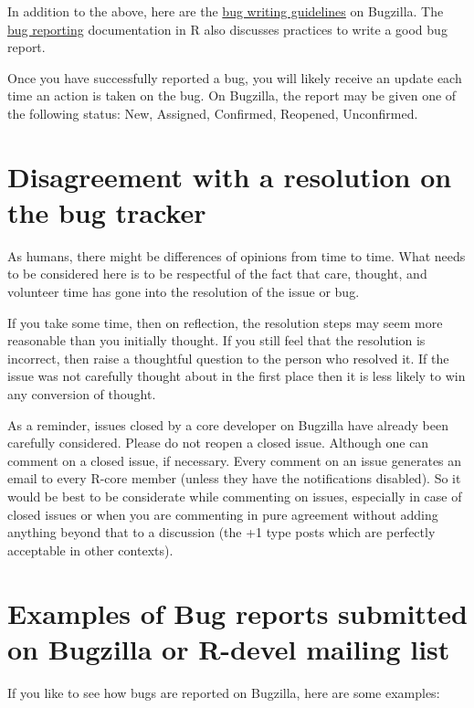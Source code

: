 \documentclass[
  letterpaper,
  DIV=11,
  numbers=noendperiod]{scrreprt}
\begin{document}
In addition to the above, here are the
\href{https://bugs.r-project.org/bugzilla/page.cgi?id=bug-writing.html}{bug
writing guidelines} on Bugzilla. The
\href{https://www.r-project.org/bugs.html\#writing-a-good-bug-report}{bug
reporting} documentation in R also discusses practices to write a good
bug report.

Once you have successfully reported a bug, you will likely receive an
update each time an action is taken on the bug. On Bugzilla, the report
may be given one of the following status: New, Assigned, Confirmed,
Reopened, Unconfirmed.

\section{Disagreement with a resolution on the bug
tracker}\label{disagreement-with-a-resolution-on-the-bug-tracker}

As humans, there might be differences of opinions from time to time.
What needs to be considered here is to be respectful of the fact that
care, thought, and volunteer time has gone into the resolution of the
issue or bug.

If you take some time, then on reflection, the resolution steps may seem
more reasonable than you initially thought. If you still feel that the
resolution is incorrect, then raise a thoughtful question to the person
who resolved it. If the issue was not carefully thought about in the
first place then it is less likely to win any conversion of thought.

As a reminder, issues closed by a core developer on Bugzilla have
already been carefully considered. Please do not reopen a closed issue.
Although one can comment on a closed issue, if necessary. Every comment
on an issue generates an email to every R-core member (unless they have
the notifications disabled). So it would be best to be considerate while
commenting on issues, especially in case of closed issues or when you
are commenting in pure agreement without adding anything beyond that to
a discussion (the +1 type posts which are perfectly acceptable in other
contexts).

\section{Examples of Bug reports submitted on Bugzilla or R-devel
mailing
list}\label{examples-of-bug-reports-submitted-on-bugzilla-or-r-devel-mailing-list}

If you like to see how bugs are reported on Bugzilla, here are some
examples:
\end{document}
